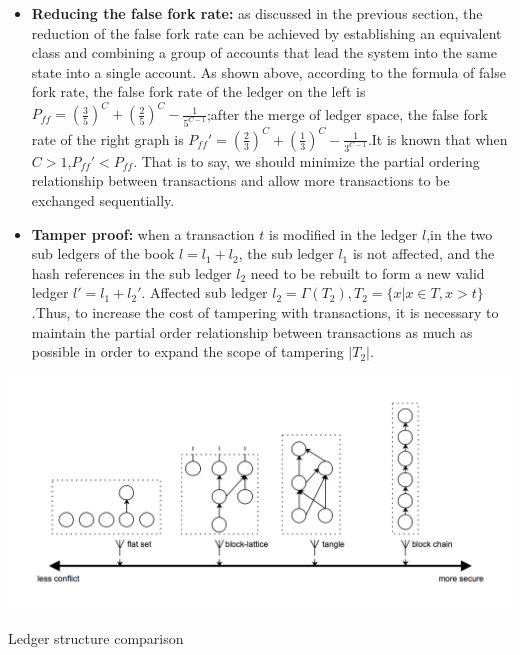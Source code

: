 \documentclass[UTF8,nofonts]{article}
\makeatletter
\newenvironment{figurehere}
 {\def\@captype{figure}}
 {}
\makeatother
\begin{document}
\begin{multicols}{2}
\begin{itemize}
	\item \textbf{Reducing the false fork rate:} as discussed in the previous section, the reduction of the false fork rate can be achieved by establishing an equivalent class and combining a group of accounts that lead the system into the same state into a single account. As shown above, according to the formula of false fork rate, the false fork rate of the ledger on the left is $P_{ff}=\left (  \frac{3}{5} \right )^{C} + \left (  \frac{2}{5} \right )^{C} - \frac{1}{5^{C-1}}$;after the merge of ledger space, the false fork rate of the right graph is ${P_{ff}}'=\left (  \frac{2}{3} \right )^{C} + \left (  \frac{1}{3} \right )^{C} - \frac{1}{3^{C-1}}$.It is known that when $C > 1$,${P_{ff}}' < P_{ff}$. That is to say, we should minimize the partial ordering relationship between transactions and allow more transactions to be exchanged sequentially.
	\item \textbf{Tamper proof:} when a transaction $t$ is modified in the ledger $l$,in the two sub ledgers of the book $l = l_{1} + l_{2}$, the sub ledger  $l_{1}$ is not affected, and the hash references in the sub ledger $l_{2}$ need to be rebuilt to form a new valid ledger ${l}' = l_{1} + {l_{2}}'$. Affected sub ledger $l_{2} = \Gamma(T_{2}),T_{2} = \lbrace x \vert x \in T, x > t \rbrace $.Thus, to increase the cost of tampering with transactions, it is necessary to maintain the partial order relationship between transactions as much as possible in order to expand the scope of tampering $\vert T_{2} \vert$.
\end{itemize}

\begin{center}
\begin{figurehere}
\includegraphics[width=\linewidth]{image/ledger-compare.png}
\caption{Ledger structure comparison}
\end{figurehere}
\end{center}


\end{multicols}
\end{document}
